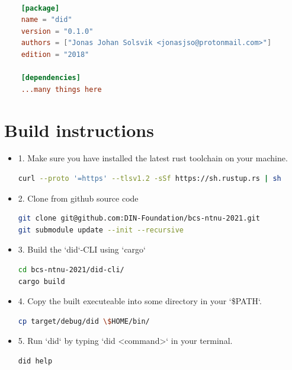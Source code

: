    \begin{lstlisting}[language=toml,caption={Cargo.toml}]
    
    [package]
    name = "did"
    version = "0.1.0"
    authors = ["Jonas Johan Solsvik <jonasjso@protonmail.com>"]
    edition = "2018"

    [dependencies]
    ...many things here
    \end{lstlisting}


\section{Build instructions}

\begin{itemize}
\item 1. Make sure you have installed the latest rust toolchain on your machine.

\begin{lstlisting}[language=bash,caption={From https://rustup.rs/}]
curl --proto '=https' --tlsv1.2 -sSf https://sh.rustup.rs | sh
\end{lstlisting}

\item 2. Clone from github source code

\begin{lstlisting}[language=bash,caption={}]
git clone git@github.com:DIN-Foundation/bcs-ntnu-2021.git
git submodule update --init --recursive
\end{lstlisting}


\item 3. Build the `did`-CLI using `cargo`

\begin{lstlisting}[language=bash,caption={}]
cd bcs-ntnu-2021/did-cli/
cargo build
\end{lstlisting}

\item 4. Copy the built executeable into some directory in your `\$PATH`.

\begin{lstlisting}[language=bash,caption={}]
cp target/debug/did \$HOME/bin/
\end{lstlisting}


\item 5. Run `did` by typing `did <command>` in your terminal.

\begin{lstlisting}[language=bash,caption={}]
did help
\end{lstlisting}
\end{itemize}



